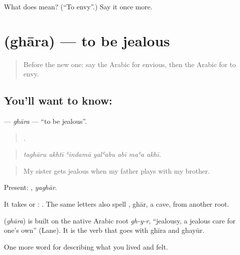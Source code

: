 \begin{tcolorbox}[breakable,colback=teal!4,colframe=teal!35!black,title={Before you move on}]
What does  mean? (\textquotedblleft{}To envy\textquotedblright{}.) Say it once more.
\end{tcolorbox}
\section[\texorpdfstring{\ar{غار} (ghāra)}{غار (ghāra)}]{ (ghāra) — to be jealous}

\label{lesson:AR-C492-ghara}



\begin{quote}
Before the new one: say the Arabic for envious, then the Arabic for to envy.
\end{quote}

\subsection*{You'll want to know: }
\textbf{} — \emph{ghāra} — \textquotedblleft{}to be jealous\textquotedblright{}.

\begin{quote}
      .
\end{quote}

\begin{quote}
\emph{taghāru ukhtī ʿindamā yalʿabu abī maʿa akhī.}
\end{quote}

\begin{quote}
My sister gets jealous when my father plays with my brother.
\end{quote}

Present: , \emph{yaghār}.

It takes  or :  . The same letters also spell , ghār, a cave, from another root.

\begin{cousinweb}
\textbf{} (\emph{ghāra}) is built on the native Arabic root \emph{gh-y-r}, \textquotedblleft{}jealousy, a jealous care for one's own\textquotedblright{} (Lane). It is the verb that goes with ghīra and ghayūr.
\end{cousinweb}

\begin{grammarlens}[title={What you've built}]
One more word for describing what you lived and felt.
\end{grammarlens}

